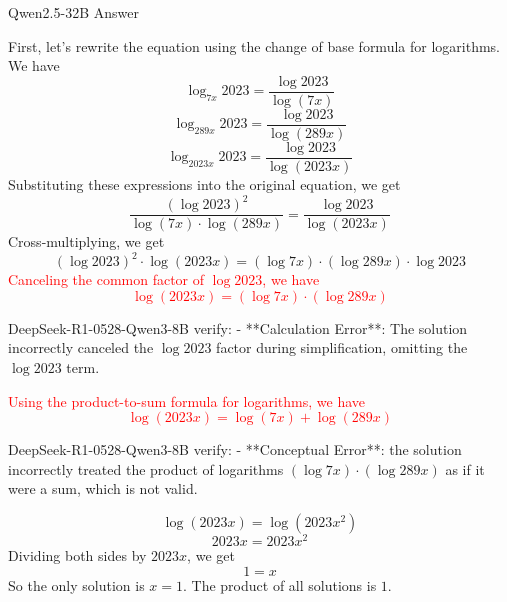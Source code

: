 
\begin{answerbox}{Qwen2.5-32B Answer}

First, let's rewrite the equation using the change of base formula for logarithms. We have
\[\log_{7x}2023=\frac{\log 2023}{\log(7x)}\]
\[\log_{289x}2023=\frac{\log 2023}{\log(289x)}\]
\[\log_{2023x}2023=\frac{\log 2023}{\log(2023x)}\]
Substituting these expressions into the original equation, we get
\[\frac{(\log 2023)^2}{\log(7x)\cdot \log(289x)}=\frac{\log 2023}{\log(2023x)}\]
Cross-multiplying, we get
\[(\log 2023)^2\cdot \log(2023x)=(\log 7x)\cdot (\log 289x)\cdot \log 2023\]
\textcolor{red}{Canceling the common factor of $\log 2023$, we have
\[\log(2023x)=(\log 7x)\cdot (\log 289x)\]}
\begin{tcolorbox}[
    colback=blue!5!white,         %
    colframe=blue!40!white,       %
]
DeepSeek-R1-0528-Qwen3-8B verify:  - **Calculation Error**: The solution incorrectly canceled the \(\log 2023\) factor during simplification, omitting the \(\log 2023\) term. 

\end{tcolorbox}

\textcolor{red}{Using the product-to-sum formula for logarithms, we have
\[\log(2023x)=\log(7x)+\log(289x)\]}
\begin{tcolorbox}[
    colback=blue!5!white,         %
    colframe=blue!40!white,       %
]
DeepSeek-R1-0528-Qwen3-8B verify: - **Conceptual Error**: the solution incorrectly treated the product of logarithms \((\log 7x) \cdot (\log 289x)\) as if it were a sum, which is not valid. 

\end{tcolorbox}
\[\log(2023x)=\log(2023x^2)\]
\[2023x=2023x^2\]
Dividing both sides by $2023x$, we get
\[1=x\]
So the only solution is $x=1$. The product of all solutions is $\boxed{1}$.

\end{answerbox}


